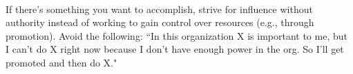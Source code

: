 \ \\

If there's something you want to accomplish, strive for influence without authority instead of working to gain control over resources (e.g., through promotion). Avoid the following: ``In this organization X is important to me, but I can't do X right now because I don't have enough power in the org. So I'll get promoted and then do X."

\ \\

